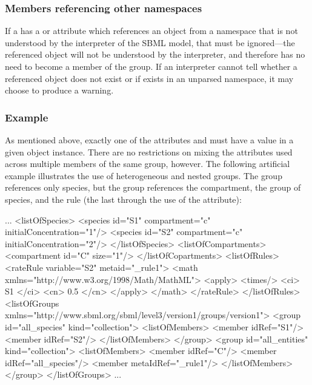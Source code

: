 \subsubsection{Members referencing other namespaces}
\label{unfindable-members}

If a \Member has a  or  attribute which references an object from a namespace that is not understood by the interpreter of the SBML model, that \Member must be ignored---the referenced object will not be understood by the interpreter, and therefore has no need to become a member of the group. If an interpreter cannot tell whether a referenced object does not exist or if exists in an unparsed namespace, it may choose to produce a warning.


\subsubsection{Example}

As mentioned above, exactly one of the attributes  and  must have a value in a given \Member object instance.  There are no restrictions on mixing the attributes used across multiple members of the same group, however.  The following artificial example illustrates the use of heterogeneous and nested groups.  The group  references only species, but the group  references the compartment, the group of species, and the rule (the last through the use of the  attribute):

\begin{example}
...
  <listOfSpecies>     
      <species id="S1" compartment="c" initialConcentration="1"/> 
      <species id="S2" compartment="c" initialConcentration="2"/> 
  </listOfSpecies>   
  <listOfCompartments>   
      <compartment id="C" size="1"/>
  </listOfCopartments>   
  <listOfRules>
      <rateRule variable="S2" metaid="_rule1">
          <math xmlns="http://www.w3.org/1998/Math/MathML">
              <apply>
                  <times/>
                  <ci> S1 </ci>
                  <cn> 0.5 </cn>
              </apply>
          </math>
      </rateRule>
  </listOfRules>
  <listOfGroups xmlns="http://www.sbml.org/sbml/level3/version1/groups/version1">   
      <group id="all_species" kind="collection">
          <listOfMembers>
              <member idRef="S1"/> 
              <member idRef="S2"/> 
          </listOfMembers>
      </group> 
      <group id="all_entities" kind="collection">
          <listOfMembers>
              <member idRef="C"/> 
              <member idRef="all_species"/> 
              <member metaIdRef="_rule1"/> 
          </listOfMembers>
      </group> 
  </listOfGroups>   
...
\end{example}


